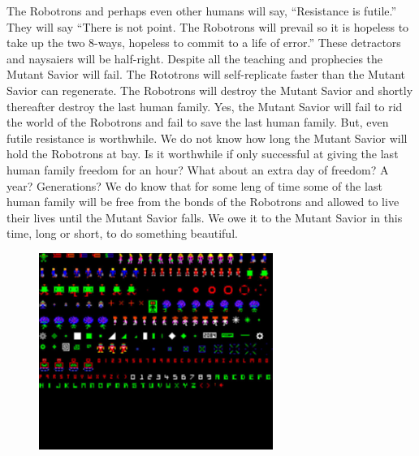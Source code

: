 \documentclass{amsbook}
\begin{document}
The Robotrons and perhaps even other humans will say, ``Resistance is
futile.'' They will say ``There is not point. The Robotrons will prevail
so it is hopeless to take up the two 8-ways, hopeless to commit to a
life of error.'' These detractors and naysaiers will be half-right.
Despite all the teaching and prophecies the Mutant Savior will fail.
The Rototrons will self-replicate faster than the Mutant Savior can
regenerate. The Robotrons will destroy the Mutant Savior and shortly
thereafter destroy the last human family. Yes, the Mutant Savior will
fail to rid the world of the Robotrons and fail to  save the last
human family. But, even futile resistance is worthwhile. We do not
know how long the Mutant Savior will hold the Robotrons at bay. Is it
worthwhile if only successful at giving the last human family freedom
for an hour? What about an extra day of freedom? A year? Generations?
We do know that for some leng of time some of the last human family
will be free from the bonds of the Robotrons and allowed to live their
lives until the Mutant Savior falls. We owe it to the Mutant Savior in
this time, long or short, to do something beautiful.

\begin{figure}[h]
  \includegraphics[width=3in]{robotronsprites.jpg}
\end{figure}
\end{document}

